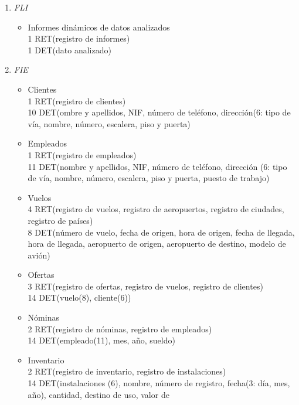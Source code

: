 \begin{enumerate}
	\item \textit{FLI}
		\begin{itemize}
			\item Informes dinámicos de datos analizados \\
			1 RET(registro de informes) \\
			1 DET(dato analizado) \\
		\end{itemize}
	\item \textit{FIE}
		\begin{itemize}
			\item Clientes  \\
			1 RET(registro de clientes) \\
			10 DET(ombre y apellidos, NIF, número de teléfono, dirección(6: tipo de vía, nombre, número, escalera, piso y puerta) \\
			\item Empleados \\
			1 RET(registro de empleados) \\
			11 DET(nombre y apellidos, NIF, número de teléfono, dirección (6: tipo de vía, nombre, número, escalera, piso y puerta,
			puesto de trabajo) \\
			\item Vuelos \\
			4 RET(registro de vuelos, registro de aeropuertos, registro de ciudades, registro de países) \\
			8 DET(número de vuelo, fecha de origen, hora de origen, fecha de llegada, hora de llegada, aeropuerto de origen,
			aeropuerto de destino, modelo de avión) \\
			\item Ofertas \\
			3 RET(registro de ofertas, registro de vuelos, registro de clientes) \\
			14 DET(vuelo(8), cliente(6)) \\
			\item Nóminas \\
			2 RET(registro de nóminas, registro de empleados) \\
			14 DET(empleado(11), mes, año, sueldo) \\
			\item Inventario \\
			2 RET(registro de inventario, registro de instalaciones) \\
			14 DET(instalaciones (6), nombre, número de registro, fecha(3: día, mes, año), cantidad, destino de uso, valor de

\end{itemize}
\end{enumerate}
